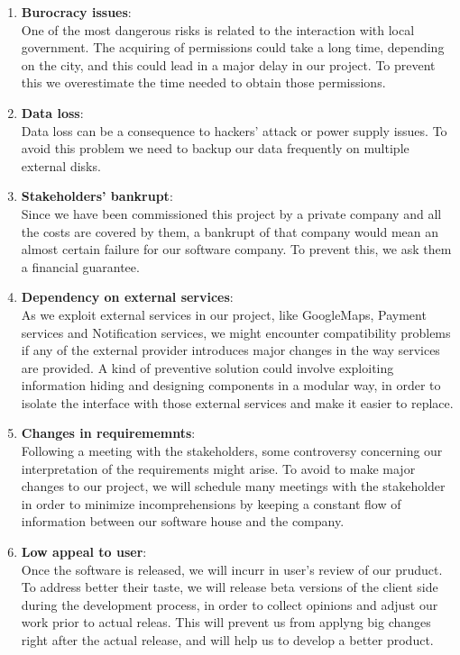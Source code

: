 \begin{enumerate}

\item \textbf{Burocracy issues}:\\
One of the most dangerous risks is related to the interaction with local government. The acquiring of permissions could take a long time, depending on the city, and this could lead in a major delay in our project. To prevent this we overestimate the time needed to obtain those permissions.
\item \textbf{Data loss}:\\
Data loss can be a consequence to hackers' attack or power supply issues. To avoid this problem we need to backup our data frequently on multiple external disks.
\item \textbf{Stakeholders' bankrupt}:\\
Since we have been commissioned this project by a private company and all the costs are covered by them, a bankrupt of that company would mean an almost certain failure for our software company. To prevent this, we ask them a financial guarantee.
\item \textbf{Dependency on external services}:\\
As we exploit external services in our project, like GoogleMaps, Payment services and Notification services, we might encounter compatibility problems if any of the external provider introduces major changes in the way services are provided.
A kind of preventive solution could involve exploiting information hiding and designing components in a modular way, in order to isolate the interface with those external services and make it easier to replace.
\item \textbf{Changes in requirememnts}:\\
Following a meeting with the stakeholders, some controversy concerning our interpretation of the requirements might arise. To avoid to make major changes to our project, we will schedule many meetings with the stakeholder in order to minimize incomprehensions by keeping a constant flow of information between our software house and the company.
\item \textbf{Low appeal to user}:\\
Once the software is released, we will incurr in user's review of our pruduct. To address better their taste, we will release beta versions of the client side during the development process, in order to collect opinions and adjust our work prior to actual releas. This will prevent us from applyng big changes right after the actual release, and will help us to develop a better product.
\end{enumerate}